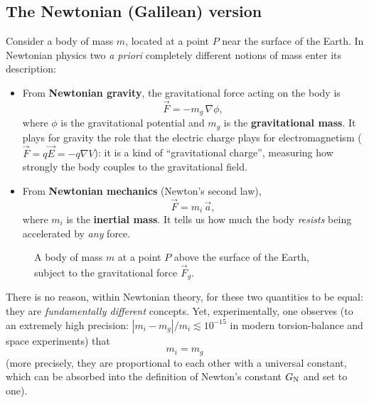 \subsection{The Newtonian (Galilean) version}

Consider a body of mass $m$, located at a point $P$ near the surface of the Earth. In Newtonian physics two \emph{a priori} completely different notions of mass enter its description:
\begin{itemize}
  \item From \textbf{Newtonian gravity}, the gravitational force acting on the body is
  \begin{equation}
    \vec F = -m_g\,\nabla\phi ,
  \end{equation}
  where $\phi$ is the gravitational potential and $m_g$ is the \textbf{gravitational mass}.
  It plays for gravity the role that the electric charge plays for electromagnetism ($\vec F=q\vec E=-q\nabla V$): it is a kind of ``gravitational charge'', measuring how strongly the body couples to the gravitational field.
  \item From \textbf{Newtonian mechanics} (Newton's second law),
  \begin{equation}
    \vec F = m_i\,\vec a ,
  \end{equation}
  where $m_i$ is the \textbf{inertial mass}. It tells us how much the body \emph{resists} being accelerated by \emph{any} force.
\end{itemize}

\begin{figure}[ht]
\centering
{}
\caption{A body of mass $m$ at a point $P$ above the surface of the Earth, subject to the gravitational force $\vec F_g$.}
\label{fig:newton-ep}
\end{figure}

There is no reason, within Newtonian theory, for these two quantities to be equal: they are \emph{fundamentally different} concepts. Yet, experimentally, one observes (to an extremely high precision: $|m_i-m_g|/m_i\lesssim 10^{-15}$ in modern torsion-balance and space experiments) that
\begin{equation}
  m_i = m_g
\end{equation}
(more precisely, they are proportional to each other with a universal constant, which can be absorbed into the definition of Newton's constant $G_{\mathrm N}$ and set to one).

